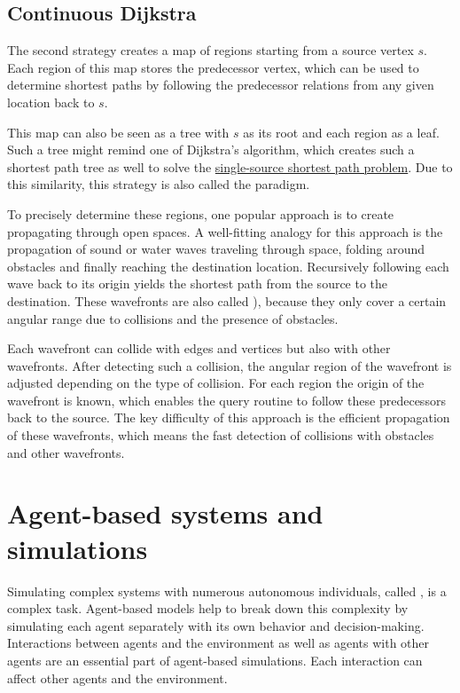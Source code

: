 	\subsection{Continuous Dijkstra}
	\label{subsec:continuous-dijkstra}
	
		The second strategy creates a map of regions starting from a source vertex $s$.
		Each region of this map stores the predecessor vertex, which can be used to determine shortest paths by following the predecessor relations from any given location back to $s$.

		This map can also be seen as a tree with $s$ as its root and each region as a leaf.
		Such a tree might remind one of Dijkstra's algorithm, which creates such a shortest path tree as well to solve the \hyperref[subsubsec:single-source-shortest-path]{single-source shortest path problem}.
		Due to this similarity, this strategy is also called the  paradigm\cite{mitchell-discrete-geodesic}.
		
		To precisely determine these regions, one popular approach is to create  propagating through open spaces.
		A well-fitting analogy for this approach is the propagation of sound or water waves traveling through space, folding around obstacles and finally reaching the destination location.
		Recursively following each wave back to its origin yields the shortest path from the source to the destination.
		These wavefronts are also called ), because they only cover a certain angular range due to collisions and the presence of obstacles.
		
		Each wavefront can collide with edges and vertices but also with other wavefronts.
		After detecting such a collision, the angular region of the wavefront is adjusted depending on the type of collision.
		For each region the origin of the wavefront is known, which enables the query routine to follow these predecessors back to the source.
		The key difficulty of this approach is the efficient propagation of these wavefronts, which means the fast detection of collisions with obstacles and other wavefronts\cite{hershberger-suri}.

\section{Agent-based systems and simulations}

	Simulating complex systems with numerous autonomous individuals, called , is a complex task.
	Agent-based models help to break down this complexity by simulating each agent separately with its own behavior and decision-making\cite{macal-introductory-tutorial}.
	Interactions between agents and the environment as well as agents with other agents are an essential part of agent-based simulations.
	Each interaction can affect other agents and the environment.
	

